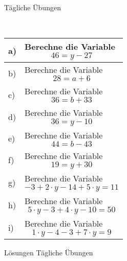 \documentclass[12pt]{article}
\begin{document}
\centerline{{\Large Tägliche Übungen}} 
\vspace{1cm}
\noindent \\


\begin{xltabular}{\textwidth}{|C{0.75cm}|X|}
\hline
a)&Berechne die Variable $$46=y-27$$
\\\hline
b)&Berechne die Variable $$28=a+6$$
\\\hline
c)&Berechne die Variable $$36=b+33$$
\\\hline
d)&Berechne die Variable $$36=y-10$$
\\\hline
e)&Berechne die Variable $$44=b-43$$
\\\hline
f)&Berechne die Variable $$19=y+30$$
\\\hline
g)&Berechne die Variable $$-3+2\cdot y-14+5\cdot y=11$$
\\\hline
h)&Berechne die Variable $$5\cdot y-3+4\cdot y-10=50$$
\\\hline
i)&Berechne die Variable $$1\cdot y-4-3+7\cdot y=9$$
\\\hline
\end{xltabular}
\vspace{0.5cm}
\newpage
{}
\centerline{{\large Lösungen Tägliche Übungen}} 
\vspace{0.5cm}
\end{document}
